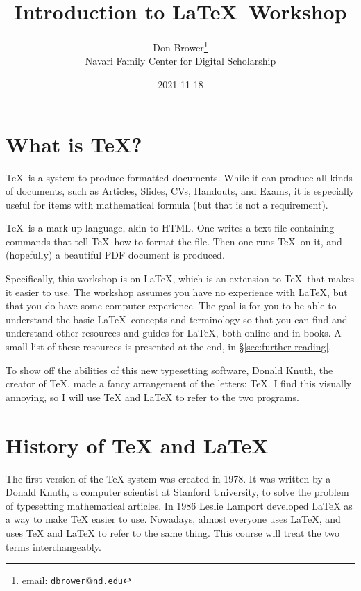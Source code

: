 \documentclass{article}
\begin{document}
\title{Introduction to \LaTeX\ Workshop}
\author{Don Brower\thanks{email: \texttt{dbrower$@$nd.edu}} \\ Navari Family Center for Digital Scholarship}
\date{2021-11-18}
\maketitle

\section{What is \TeX?}

\TeX\ is a system to produce formatted documents.
While it can produce all kinds of documents, such as Articles, Slides, CVs, Handouts, and Exams,
it is especially useful for items with mathematical formula (but that is not a requirement).

\TeX\ is a mark-up language, akin to HTML.
One writes a text file containing commands that tell \TeX\ how to format the file.
Then one runs \TeX\ on it, and (hopefully) a beautiful PDF document is produced.

Specifically, this workshop is on \LaTeX, which is an extension to \TeX\ that makes it easier to use.
The workshop assumes you have no experience with \LaTeX, but that you do have some computer experience.
The goal is for you to be able to understand the basic \LaTeX\ concepts and terminology so that you can
find and understand other resources and guides for \LaTeX, both online and in books.
A small list of these resources is presented at the end, in \S\ref{sec:further-reading}.

To show off the abilities of this new typesetting software, Donald Knuth, the creator of \TeX,
made a fancy arrangement of the letters: \TeX.
I find this visually annoying, so I will use TeX and LaTeX to refer to the two programs.

\section{History of TeX and LaTeX}

The first version of the TeX system was created in 1978.
It was written by a Donald Knuth, a computer scientist at Stanford University,
to solve the problem of typesetting mathematical articles.
In 1986 Leslie Lamport developed LaTeX as a way to make TeX easier to use.
Nowadays, almost everyone uses LaTeX, and uses TeX and LaTeX to refer to the same
thing.
This course will treat the two terms interchangeably.
\end{document}
